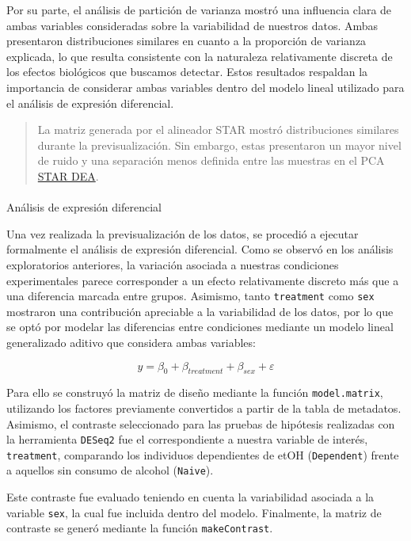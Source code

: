 \documentclass[
  9pt,
]{article}
\makeatletter
\let\oldparagraph\paragraph
\renewcommand{\paragraph}{
    \@ifstar
      \xxxParagraphStar
      \xxxParagraphNoStar
  }
\newcommand{\xxxParagraphStar}[1]{\oldparagraph*{#1}\mbox{}}
\newcommand{\xxxParagraphNoStar}[1]{\oldparagraph{#1}\mbox{}}
\makeatother
\begin{document}
Por su parte, el análisis de partición de varianza mostró una influencia
clara de ambas variables consideradas sobre la variabilidad de nuestros
datos. Ambas presentaron distribuciones similares en cuanto a la
proporción de varianza explicada, lo que resulta consistente con la
naturaleza relativamente discreta de los efectos biológicos que buscamos
detectar. Estos resultados respaldan la importancia de considerar ambas
variables dentro del modelo lineal utilizado para el análisis de
expresión diferencial.

\begin{quote}
La matriz generada por el alineador STAR mostró distribuciones similares
durante la previsualización. Sin embargo, estas presentaron un mayor
nivel de ruido y una separación menos definida entre las muestras en el
PCA \hyperref[DEA_star]{STAR DEA}.
\end{quote}

\paragraph{Análisis de expresión
diferencial}\label{anuxe1lisis-de-expresiuxf3n-diferencial}

Una vez realizada la previsualización de los datos, se procedió a
ejecutar formalmente el análisis de expresión diferencial. Como se
observó en los análisis exploratorios anteriores, la variación asociada
a nuestras condiciones experimentales parece corresponder a un efecto
relativamente discreto más que a una diferencia marcada entre grupos.
Asimismo, tanto \texttt{treatment} como \texttt{sex} mostraron una
contribución apreciable a la variabilidad de los datos, por lo que se
optó por modelar las diferencias entre condiciones mediante un modelo
lineal generalizado aditivo que considera ambas variables:

\[y = β_0 + β_{treatment} + β_{sex} + ε\]

Para ello se construyó la matriz de diseño mediante la función
\texttt{model.matrix}, utilizando los factores previamente convertidos a
partir de la tabla de metadatos. Asimismo, el contraste seleccionado
para las pruebas de hipótesis realizadas con la herramienta
\texttt{DESeq2} fue el correspondiente a nuestra variable de interés,
\texttt{treatment}, comparando los individuos dependientes de etOH
(\texttt{Dependent}) frente a aquellos sin consumo de alcohol
(\texttt{Naive}).

Este contraste fue evaluado teniendo en cuenta la variabilidad asociada
a la variable \texttt{sex}, la cual fue incluida dentro del modelo.
Finalmente, la matriz de contraste se generó mediante la función
\texttt{makeContrast}.
\end{document}
